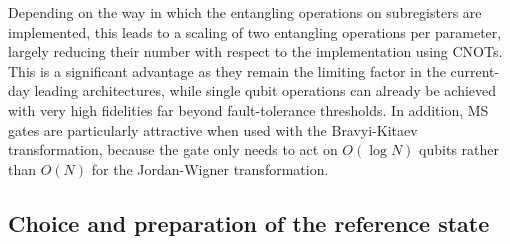 \documentclass[superscriptaddress,aps,pra,twocolumn,nofootinbib,babel]{revtex4-1}
\newcommand{\ch}[1]{{\color{orange}{#1}}}
\begin{document}
Depending on the way in which the entangling operations on subregisters are implemented, this leads to a scaling of two entangling operations per parameter, largely reducing their number with respect to the implementation using CNOTs. This is a significant advantage as they remain the limiting factor in the current-day leading architectures, while single qubit operations can already be achieved with very high fidelities far beyond fault-tolerance thresholds. In addition, MS gates are particularly attractive when used with the Bravyi-Kitaev transformation, because the gate only needs to act on $O(\log N)$ qubits rather than $O(N)$ for the Jordan-Wigner transformation.

\subsection{Choice and preparation of the reference state}
\end{document}
